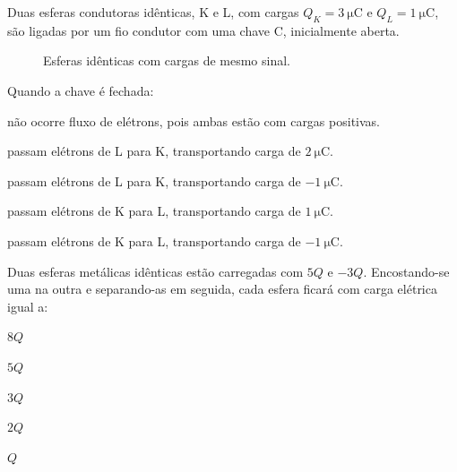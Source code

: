 \begin{questao}[2]{}

Duas esferas condutoras idênticas, K e L, com cargas
$Q_K = \SI{+3}{\micro\coulomb}$ e $Q_L = \SI{+1}{\micro\coulomb}$, são ligadas por
um fio condutor com uma chave C, inicialmente aberta.

\begin{figure}[H]
\centering
{}
\caption{Esferas idênticas com cargas de mesmo sinal.}
\label{fig:esferas-chave-kl}
\end{figure}

Quando a chave é fechada:
\begin{alternativas}
\item não ocorre fluxo de elétrons, pois ambas estão com cargas positivas.
\item passam elétrons de L para K, transportando carga de $\SI{+2}{\micro\coulomb}$.
\item passam elétrons de L para K, transportando carga de $\SI{-1}{\micro\coulomb}$.
\item passam elétrons de K para L, transportando carga de $\SI{+1}{\micro\coulomb}$.
\item passam elétrons de K para L, transportando carga de $\SI{-1}{\micro\coulomb}$.
\end{alternativas}


\end{questao}
\begin{questao}[2]{}

Duas esferas metálicas idênticas estão carregadas com $5Q$ e $-3Q$.
Encostando-se uma na outra e separando-as em seguida, cada esfera ficará com
carga elétrica igual a:
\begin{alternativas}[3]
\item $8Q$
\item $5Q$
\item $3Q$
\item $2Q$
\item $Q$
\end{alternativas}


\end{questao}
